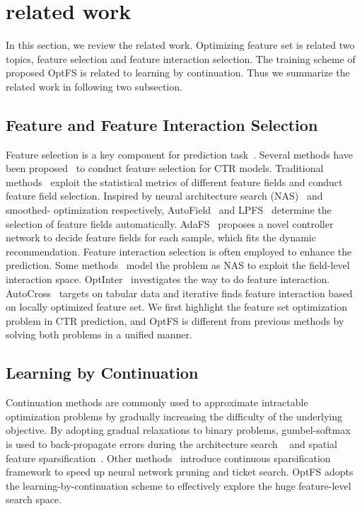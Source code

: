 \documentclass[sigconf]{acmart}
\begin{document}
\vspace{-3pt}
 \section{related work}
\label{sec:rw}

In this section, we review the related work. Optimizing feature set is related two topics, feature selection and feature interaction selection. The training scheme of proposed OptFS is related to learning by continuation. Thus we summarize the related work in following two subsection.

\vspace{-3pt}

\subsection{Feature and Feature Interaction Selection}
Feature selection is a key component for prediction task~\cite{DFS}. Several methods have been proposed~\cite{LASSO, MCF, AutoField, LPFS, AdaFS} to conduct feature selection for CTR models. Traditional methods~\cite{LASSO, MCF} exploit the statistical metrics of different feature fields and conduct feature field selection. Inspired by neural architecture search (NAS)~\cite{DARTS, NAO} and smoothed- optimization respectively, AutoField~\cite{AutoField} and LPFS~\cite{LPFS} determine the selection of feature fields automatically. AdaFS~\cite{AdaFS} proposes a novel controller network to decide feature fields for each sample, which fits the dynamic recommendation.
Feature interaction selection is often employed to enhance the prediction. Some methods~\cite{AutoFIS, AutoFeature} model the problem as NAS to exploit the field-level interaction space. OptInter~\cite{OptInter} investigates the way to do feature interaction. AutoCross~\cite{AutoCross} targets on tabular data and iterative finds feature interaction based on locally optimized feature set.
We first highlight the feature set optimization problem in CTR prediction, and OptFS is different from previous methods by solving both problems in a unified manner.

\vspace{-5pt}

\subsection{Learning by Continuation}
Continuation methods are commonly used to approximate intractable optimization problems by gradually increasing the difficulty of the underlying objective. By adopting gradual relaxations to binary problems, gumbel-softmax~\cite{Gumbel-Softmax} is used to back-propagate errors during the architecture search ~\cite{fbnet} and spatial feature sparsification~\cite{feature_spar}. Other methods~\cite{Cont_Spar, DST, Grow_Spar} introduce continuous sparsification framework to speed up neural network pruning and ticket search.
OptFS adopts the learning-by-continuation scheme to effectively explore the huge feature-level search space.
\end{document}

